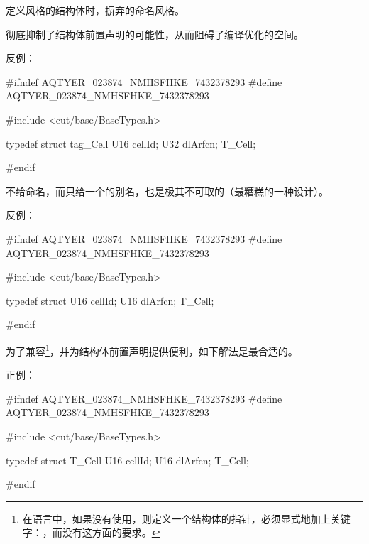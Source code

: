 \begin{content}
\begin{regulation}
定义\clang{}风格的结构体时，摒弃的命名风格。
\end{regulation}

彻底抑制了结构体前置声明的可能性，从而阻碍了编译优化的空间。

反例：
\begin{leftbar}
\begin{c++}[caption={\ttfamily{radio/domain/Cell.h}}]
#ifndef AQTYER_023874_NMHSFHKE_7432378293
#define AQTYER_023874_NMHSFHKE_7432378293

#include <cut/base/BaseTypes.h>

typedef struct tag_Cell
{
    U16 cellId;
    U32 dlArfcn;
} T_Cell;

#endif
\end{c++}
\end{leftbar}

不给命名，而只给一个的别名，也是极其不可取的（最糟糕的一种设计）。

反例：

\begin{leftbar}
\begin{c++}[caption={\ttfamily{radio/domain/Cell.h}}]
#ifndef AQTYER_023874_NMHSFHKE_7432378293
#define AQTYER_023874_NMHSFHKE_7432378293

#include <cut/base/BaseTypes.h>

typedef struct
{
    U16 cellId;
    U16 dlArfcn;
} T_Cell;

#endif
\end{c++}
\end{leftbar}

为了兼容\clang{}\footnote{在\clang{}语言中，如果没有使用，则定义一个结构体的指针，必须显式地加上关键字：，而\cpp{}没有这方面的要求。}，并为结构体前置声明提供便利，如下解法是最合适的。

正例：
\begin{leftbar}
\begin{c++}[caption={\ttfamily{radio/domain/Cell.h}}]
#ifndef AQTYER_023874_NMHSFHKE_7432378293
#define AQTYER_023874_NMHSFHKE_7432378293

#include <cut/base/BaseTypes.h>

typedef struct T_Cell
{
    U16 cellId;
    U16 dlArfcn;
} T_Cell;

#endif
\end{c++}
\end{leftbar}


\end{content}
